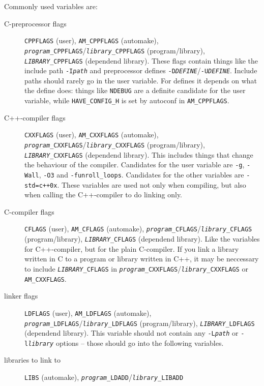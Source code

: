 \documentclass[11pt,a4paper,headinclude,footinclude,DIV16,normalheadings]{scrartcl}
\begin{document}
Commonly used variables are:
\begin{description}
\item[C-preprocessor flags] \texttt{CPPFLAGS} (user), \texttt{AM\_CPPFLAGS}
  (automake),
  \texttt{\textit{program}\_CPPFLAGS}/\texttt{\textit{library}\_CPPFLAGS}
  (program/library), \texttt{\textit{LIBRARY}\_CPPFLAGS} (dependend library).
  These flags contain things like the include path \texttt{-I\textit{path}}
  and preprocessor defines
  \texttt{-D\textit{DEFINE}}/\texttt{-U\textit{DEFINE}}.  Include paths should
  rarely go in the user variable.  For defines it depends on what the define
  does: things like \texttt{NDEBUG} are a definite candidate for the user
  variable, while \texttt{HAVE\_CONFIG\_H} is set by autoconf in
  \texttt{AM\_CPPFLAGS}.
\item[C++-compiler flags] \texttt{CXXFLAGS} (user), \texttt{AM\_CXXFLAGS}
  (automake),
  \texttt{\textit{program}\_CXXFLAGS}/\texttt{\textit{library}\_CXXFLAGS}
  (program/library), \texttt{\textit{LIBRARY}\_CXXFLAGS} (dependend library).
  This includes things that change the behaviour of the compiler.  Candidates
  for the user variable are \texttt{-g}, \texttt{-Wall}, \texttt{-O3} and
  \texttt{-funroll\_loops}.  Candidates for the other variables are
  \texttt{-std=c++0x}.  These variables are used not only when compiling, but
  also when calling the C++-compiler to do linking only.
\item[C-compiler flags] \texttt{CFLAGS} (user), \texttt{AM\_CFLAGS}
  (automake),
  \texttt{\textit{program}\_CFLAGS}/\texttt{\textit{library}\_CFLAGS}
  (program/library), \texttt{\textit{LIBRARY}\_CFLAGS} (dependend library).
  Like the variables for C++-compiler, but for the plain C-compiler.  If you
  link a library written in C to a program or library written in C++, it may
  be neccessary to include \texttt{\textit{LIBRARY}\_CFLAGS} in
  \texttt{\textit{program}\_CXXFLAGS}/\texttt{\textit{library}\_CXXFLAGS} or
  \texttt{AM\_CXXFLAGS}.
\item[linker flags] \texttt{LDFLAGS} (user), \texttt{AM\_LDFLAGS} (automake),
  \texttt{\textit{program}\_LDFLAGS}/\texttt{\textit{library}\_LDFLAGS}
  (program/library), \texttt{\textit{LIBRARY}\_LDFLAGS} (dependend library).
  This variable should not contain any \texttt{-L\textit{path}} or
  \texttt{-l\textit{library}} options -- those should go into the following
  variables.
\item[libraries to link to] \texttt{LIBS} (automake),
  \texttt{\textit{program}\_LDADD}/\texttt{\textit{library}\_LIBADD}

\end{description}
\end{document}

